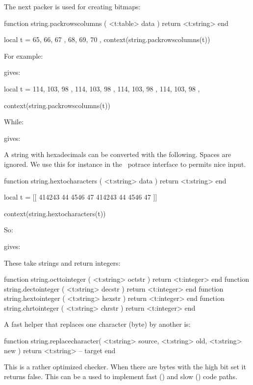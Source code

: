 The next packer is used for creating bitmaps:

\starttyping[option=LUA]
function string.packrowscolumns ( <t:table> data )
    return <t:string>
end
\stoptyping

\startbuffer
\startluacode
local t = {
    { 65, 66, 67 },
    { 68, 69, 70 },
}
context(string.packrowscolumns(t))
\stopluacode
\stopbuffer

For example:

\typebuffer

gives: \inlinebuffer

\startbuffer
\startluacode
local t = {
    { { 114, 103, 98 }, { 114, 103, 98 } },
    { { 114, 103, 98 }, { 114, 103, 98 } },
}

context(string.packrowscolumns(t))
\stopluacode
\stopbuffer

While:

\typebuffer

gives: \inlinebuffer

A string with hexadecimals can be converted with the following. Spaces are
ignored. We use this for instance in the \METAPOST\ potrace interface to
permits nice input.

\starttyping[option=LUA]
function string.hextocharacters ( <t:string> data )
    return <t:string>
end
\stoptyping

\startbuffer
\startluacode
local t = [[
  414243 44 4546 47
  414243 44 4546 47
]]

context(string.hextocharacters(t))
\stopluacode
\stopbuffer

So:

\typebuffer

gives: \inlinebuffer

These take strings and return integers:

\starttyping[option=LUA]
function string.octtointeger ( <t:string> octstr ) return <t:integer> end
function string.dectointeger ( <t:string> decstr ) return <t:integer> end
function string.hextointeger ( <t:string> hexstr ) return <t:integer> end
function string.chrtointeger ( <t:string> chrstr ) return <t:integer> end
\stoptyping

A fast helper that replaces one character (byte) by another is:

\starttyping[option=LUA]
function string.replacecharacter(
    <t:string> source,
    <t:string> old,
    <t:string> new
)
    return <t:string> -- target
end
\stoptyping

This is a rather optimized checker. When there are bytes with the high bit set it
returns false. This can be a used to implement fast (\ASCII) and slow (\UTF) code
paths.

